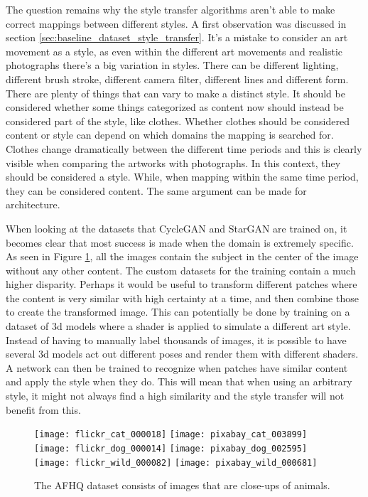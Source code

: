 The question remains why the style transfer algorithms aren't able to make correct mappings between different styles.
A first observation was discussed in section \ref{sec:baseline_dataset_style_transfer}.
It's a mistake to consider an art movement as a style, as even within the different art movements and realistic photographs there's a big variation in styles.
There can be different lighting, different brush stroke, different camera filter, different lines and different form.
There are plenty of things that can vary to make a distinct style.
It should be considered whether some things categorized as content now should instead be considered part of the style, like clothes.
Whether clothes should be considered content or style can depend on which domains the mapping is searched for.
Clothes change dramatically between the different time periods and this is clearly visible when comparing the artworks with photographs.
In this context, they should be considered a style.
While, when mapping within the same time period, they can be considered content.
The same argument can be made for architecture.

When looking at the datasets that CycleGAN and StarGAN are trained on, it becomes clear that most success is made when the domain is extremely specific.
As seen in Figure \ref{fig:AFHQ}, all the images contain the subject in the center of the image without any other content.
The custom datasets for the training contain a much higher disparity.
Perhaps it would be useful to transform different patches where the content is very similar with high certainty at a time, and then combine those to create the transformed image.
This can potentially be done by training on a dataset of 3d models where a shader is applied to simulate a different art style.
Instead of having to manually label thousands of images, it is possible to have several 3d models act out different poses and render them with different shaders.
A network can then be trained to recognize when patches have similar content and apply the style when they do.
This will mean that when using an arbitrary style, it might not always find a high similarity and the style transfer will not benefit from this.
\\

\begin{figure}[h]
	\centering
    \texttt{[image: flickr\_cat\_000018]}
    \texttt{[image: pixabay\_cat\_003899]}
    \texttt{[image: flickr\_dog\_000014]}
    \texttt{[image: pixabay\_dog\_002595]}
    \texttt{[image: flickr\_wild\_000082]}
    \texttt{[image: pixabay\_wild\_000681]}
	\caption{The \gls{AFHQ} dataset consists of images that are close-ups of animals.}
	\label{fig:AFHQ}
\end{figure}